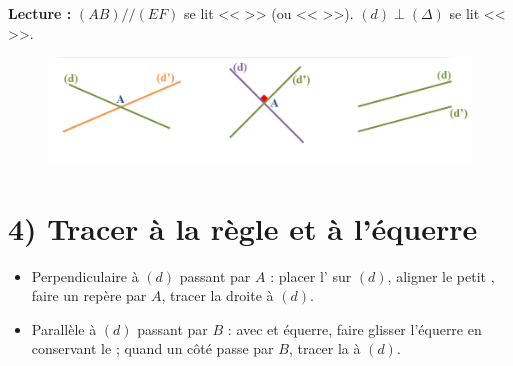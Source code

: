 \textbf{Lecture :} $(AB)//(EF)$ se lit << \trou{5cm} >> (ou << \trou{5cm} >>). \quad $(d)\perp(\Delta)$ se lit << \trou{5cm} >>.

\begin{figure}[h]
	\centering
	\includegraphics[width=1\linewidth]{images/images_seq_02/position_relative.png}
	\label{fig:Position relative de droites}
\end{figure}

\section*{4) Tracer à la règle et à l'équerre}
\begin{itemize}
	\item Perpendiculaire à $(d)$ passant par $A$ : placer l'\trou{2.5cm} sur $(d)$, aligner le petit \trou{2.3cm}, faire un repère par $A$, tracer la droite \trou{2.3cm} à $(d)$.
	\item Parallèle à $(d)$ passant par $B$ : avec \trou{2.3cm} et équerre, faire glisser l'équerre en conservant le \trou{2.3cm} ; quand un côté passe par $B$, tracer la \trou{2.3cm} à $(d)$.
\end{itemize}

